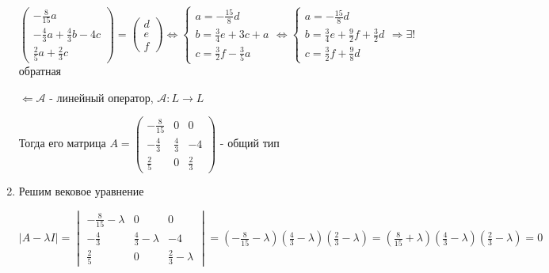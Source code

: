 \begin{enumerate}
    $\displaystyle \begin{pmatrix}
         -\frac{8}{15}a                    \\
         -\frac{4}{3}a + \frac{4}{3}b - 4c \\
         \frac{2}{5}a + \frac{2}{3}c
    \end{pmatrix} =
    \begin{pmatrix}
        d \\ e \\ f
    \end{pmatrix} \Longleftrightarrow
    \begin{cases}
        a = -\frac{15}{8}d \\
        b = \frac{3}{4}e + 3c + a \\
        c = \frac{3}{2}f - \frac{3}{5}a
    \end{cases} \Longleftrightarrow
    \begin{cases}
        a = -\frac{15}{8}d \\
        b = \frac{3}{4}e + \frac{9}{2}f + \frac{3}{2}d \\
        c = \frac{3}{2}f + \frac{9}{8}d
    \end{cases} \Longrightarrow \exists!$ обратная

    $\Longleftarrow \mathcal{A}$ - линейный оператор, $\mathcal{A}: L \to L$

    Тогда его матрица $\displaystyle A =
    \begin{pmatrix}
        -\frac{8}{15} & 0           & 0           \\
        -\frac{4}{3}  & \frac{4}{3} & - 4         \\
        \frac{2}{5}   & 0           & \frac{2}{3}
    \end{pmatrix}$ - общий тип

    \item Решим вековое уравнение

    $\displaystyle |A - \lambda I| =
    \begin{vmatrix}
        -\frac{8}{15} - \lambda & 0                     & 0                     \\
        -\frac{4}{3}            & \frac{4}{3} - \lambda & - 4                   \\
        \frac{2}{5}             & 0                     & \frac{2}{3} - \lambda
    \end{vmatrix} = \left(-\frac{8}{15} - \lambda\right) \left(\frac{4}{3} - \lambda\right) \left(\frac{2}{3} - \lambda\right) =
    \left(\frac{8}{15} + \lambda\right) \left(\frac{4}{3} - \lambda\right) \left(\frac{2}{3} - \lambda\right) = 0$


\end{enumerate}
